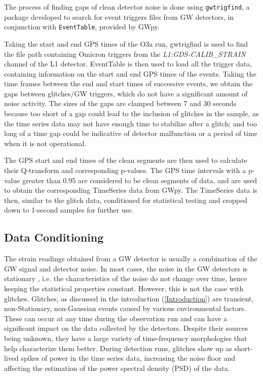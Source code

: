 \documentclass[12pt]{article}
\begin{document}
\noindent The process of finding gaps of clean detector noise is done using \texttt{gwtrigfind}, a package developed to search for event triggers files from GW detectors, in conjunction with \texttt{EventTable}, provided by GWpy.

\medskip
\noindent Taking the start and end GPS times of the O3a run, gwtrigfind is used to find the file path containing Omicron triggers from the \textit{L1:GDS-CALIB\_STRAIN} channel of the L1 detector. EventTable is then used to load all the trigger data, containing information on the start and end GPS times of the events. Taking the time frames between the end and start times of successive events, we obtain the gaps between glitches/GW triggers, which do not have a significant amount of noise activity. The sizes of the gaps are clamped between 7 and 30 seconds because too short of a gap could lead to the inclusion of glitches in the sample, as the time series data may not have enough time to stabilize after a glitch; and too long of a time gap could be indicative of detector malfunction or a period of time when it is not operational.

\medskip
\noindent The GPS start and end times of the clean segments are then used to calculate their Q-transform and corresponding p-values. The GPS time intervals with a p-value greater than 0.95 are considered to be clean segments of data, and are used to obtain the corresponding TimeSeries data from GWpy. The TimeSeries data is then, similar to the glitch data, conditioned for statistical testing and cropped down to 1-second samples for further use.


\subsection{Data Conditioning}

\noindent The strain readings obtained from a GW detector is usually a combination of the GW signal and detector noise. In most cases, the noise in the GW detectors is stationary \cite{collaboration_characterization_2016}, i.e. the characteristics of the noise do not change over time, hence keeping the statistical properties constant. However, this is not the case with glitches. Glitches, as discussed in the introduction (\ref{Introduction}) are transient, non-Stationary, non-Gaussian events caused by various environmental factors. These can occur at any time during the observation run and can have a significant impact on the data collected by the detectors. Despite their sources being unknown, they have a large variety of time-frequency morphologies that help characterize them better. During detection runs, glitches show up as short-lived spikes of power in the time series data, increasing the noise floor and affecting the estimation of the power spectral density (PSD) of the data.
\pagebreak
\end{document}
